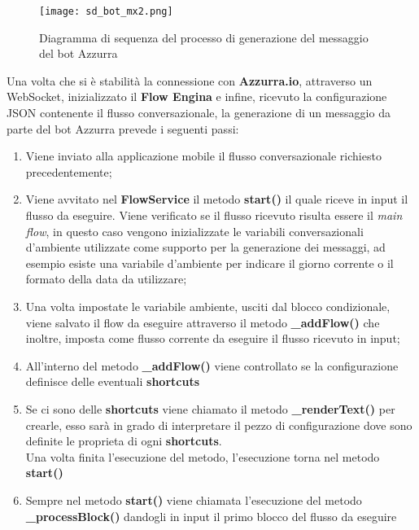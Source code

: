 \begin{figure}[htbp]
	\centering
	\texttt{[image: sd\_bot\_mx2.png]}
	\caption{Diagramma di sequenza del processo di generazione del messaggio del bot Azzurra}
\end{figure}
Una volta che si è stabilità la connessione con \textbf{Azzurra.io}, attraverso un \gls{WebSocket}, inizializzato il \textbf{Flow Engina} e infine, ricevuto la configurazione JSON contenente il flusso conversazionale, la generazione di un messaggio da parte del bot Azzurra prevede i seguenti passi:\\
\begin{enumerate}
	\item Viene inviato alla applicazione mobile il flusso conversazionale richiesto precedentemente;
	\item Viene avvitato nel \textbf{FlowService} il metodo \textbf{start()} il quale riceve in input il flusso da eseguire. Viene verificato se il flusso ricevuto risulta essere il \emph{main flow}, in questo caso vengono inizializzate le variabili conversazionali d'ambiente utilizzate come supporto per la generazione dei messaggi, ad esempio esiste una variabile d'ambiente per indicare il giorno corrente o il formato della data da utilizzare;
	\item Una volta impostate le variabile ambiente, usciti dal blocco condizionale, viene salvato il flow da eseguire attraverso il metodo \textbf{\_addFlow()} che inoltre, imposta come flusso corrente da eseguire il flusso ricevuto in input;
	\item All'interno del metodo \textbf{\_addFlow()} viene controllato se la configurazione definisce delle eventuali \textbf{shortcuts}
	\item Se ci sono delle \textbf{shortcuts} viene chiamato il metodo \textbf{\_renderText()} per crearle, esso sarà in grado di interpretare il pezzo di configurazione dove sono definite le proprieta di ogni \textbf{shortcuts}.\\
	
	Una volta finita l'esecuzione del metodo, l'esecuzione torna nel metodo \textbf{start()}\\
	\item Sempre nel metodo	\textbf{start()} viene chiamata l'esecuzione del metodo \textbf{\_processBlock()} dandogli in input il primo blocco del flusso da eseguire
	

\end{enumerate}
